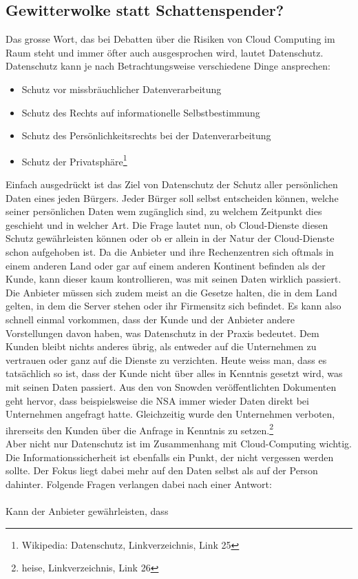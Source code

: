 \subsection{Gewitterwolke statt Schattenspender?}
Das grosse Wort, das bei Debatten über die Risiken von Cloud Computing im Raum steht und immer öfter auch ausgesprochen wird, lautet Datenschutz. Datenschutz kann je nach Betrachtungsweise verschiedene Dinge ansprechen:

\begin{itemize}
\item Schutz vor missbräuchlicher Datenverarbeitung
\item Schutz des Rechts auf informationelle Selbstbestimmung
\item Schutz des Persönlichkeitsrechts bei der Datenverarbeitung
\item Schutz der Privatsphäre\footnote{Wikipedia: Datenschutz, Linkverzeichnis, Link 25}
\end{itemize}

Einfach ausgedrückt ist das Ziel von Datenschutz der Schutz aller persönlichen Daten eines jeden Bürgers. Jeder Bürger soll selbst entscheiden können, welche seiner persönlichen Daten wem zugänglich sind, zu welchem Zeitpunkt dies geschieht und in welcher Art. Die Frage lautet nun, ob Cloud-Dienste diesen Schutz gewährleisten können oder ob er allein in der Natur der Cloud-Dienste schon aufgehoben ist. Da die Anbieter und ihre Rechenzentren sich oftmals in einem anderen Land oder gar auf einem anderen Kontinent befinden als der Kunde, kann dieser kaum kontrollieren, was mit seinen Daten wirklich passiert. Die Anbieter müssen sich zudem meist an die Gesetze halten, die in dem Land gelten, in dem die Server stehen oder ihr Firmensitz sich befindet. Es kann also schnell einmal vorkommen, dass der Kunde und der Anbieter andere Vorstellungen davon haben, was Datenschutz in der Praxis bedeutet. Dem Kunden bleibt nichts anderes übrig, als entweder auf die Unternehmen zu vertrauen oder ganz auf die Dienste zu verzichten. Heute weiss man, dass es tatsächlich so ist, dass der Kunde nicht über alles in Kenntnis gesetzt wird, was mit seinen Daten passiert. Aus den von Snowden veröffentlichten Dokumenten geht hervor, dass beispielsweise die NSA  immer wieder Daten direkt bei Unternehmen angefragt hatte. Gleichzeitig wurde den Unternehmen verboten, ihrerseits den Kunden über die Anfrage in Kenntnis zu setzen.\footnote{heise, Linkverzeichnis, Link 26}
\\
Aber nicht nur Datenschutz ist im Zusammenhang mit Cloud-Computing wichtig. Die Informationssicherheit ist ebenfalls ein Punkt, der nicht vergessen werden sollte. Der Fokus liegt dabei mehr auf den Daten selbst als auf der Person dahinter. Folgende Fragen verlangen dabei nach einer Antwort:
\\
\\
Kann der Anbieter gewährleisten, dass

